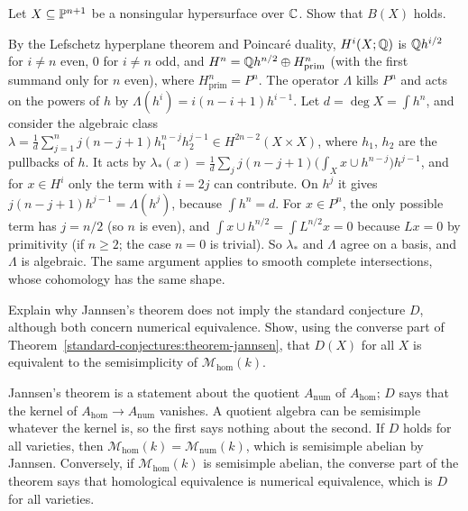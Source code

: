 \begin{exercise}\label{standard-conjectures:exercise-hypersurface}
Let $X \subseteq \mathbb{P}^{n+1}$ be a nonsingular hypersurface over $\mathbb{C}$. Show that $B(X)$ holds.
\end{exercise}

\begin{solution}
By the Lefschetz hyperplane theorem and Poincar\'e duality, $H^i(X; \mathbb{Q})$ is $\mathbb{Q} h^{i/2}$ for $i \neq n$ even, $0$ for $i \neq n$ odd, and $H^n = \mathbb{Q} h^{n/2} \oplus H^n_{\mathrm{prim}}$ (with the first summand only for $n$ even),
where $H^n_{\mathrm{prim}} = P^n$. The operator $\Lambda$ kills $P^n$ and acts on the powers of $h$ by $\Lambda(h^i) = i(n - i + 1)h^{i-1}$. Let $d = \deg X = \int h^n$, and consider the algebraic class
$\lambda = \frac1d\sum_{j=1}^nj(n - j + 1)h_1^{n-j}h_2^{j-1} \in H^{2n-2}(X \times X)$, where $h_1$, $h_2$ are the pullbacks of $h$. It acts by $\lambda_*(x) = \frac1d\sum_jj(n - j + 1)\big(\int_Xx \cup h^{n-j}\big)h^{j-1}$, and for
$x \in H^i$ only the term with $i = 2j$ can contribute. On $h^j$ it gives $j(n - j + 1)h^{j-1} = \Lambda(h^j)$, because $\int h^n = d$. For $x \in P^n$, the only possible term has $j = n/2$ (so $n$ is even), and
$\int x \cup h^{n/2} = \int L^{n/2}x = 0$ because $Lx = 0$ by primitivity (if $n \geq 2$; the case $n = 0$ is trivial). So $\lambda_*$ and $\Lambda$ agree on a basis, and $\Lambda$ is algebraic. The same argument applies to
smooth complete intersections, whose cohomology has the same shape.
\end{solution}

\begin{exercise}\label{standard-conjectures:exercise-jannsen-not-d}
Explain why Jannsen's theorem does not imply the standard conjecture $D$, although both concern numerical equivalence. Show, using the converse part of Theorem~\ref{standard-conjectures:theorem-jannsen},
that $D(X)$ for all $X$ is equivalent to the semisimplicity of $\mathcal{M}_{\mathrm{hom}}(k)$.
\end{exercise}

\begin{solution}
Jannsen's theorem is a statement about the quotient $A_{\mathrm{num}}$ of $A_{\mathrm{hom}}$; $D$ says that the kernel of $A_{\mathrm{hom}} \to A_{\mathrm{num}}$ vanishes. A quotient algebra can be semisimple whatever the kernel is, so
the first says nothing about the second. If $D$ holds for all varieties, then $\mathcal{M}_{\mathrm{hom}}(k) = \mathcal{M}_{\mathrm{num}}(k)$, which is semisimple abelian by Jannsen. Conversely, if
$\mathcal{M}_{\mathrm{hom}}(k)$ is semisimple abelian, the converse part of the theorem says that homological equivalence is numerical equivalence, which is $D$ for all varieties.
\end{solution}


